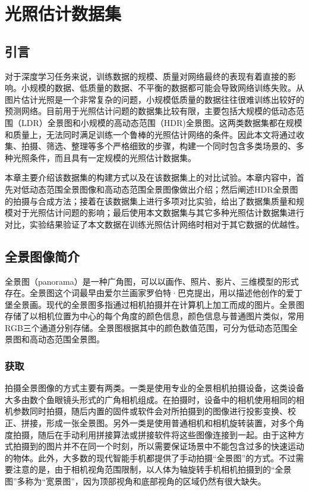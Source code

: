 \chapter{光照估计数据集}
\section{引言}
对于深度学习任务来说，训练数据的规模、质量对网络最终的表现有着直接的影响。小规模的数据、低质量的数据、不平衡的数据都可能会导致网络训练失败。从图片估计光照是一个非常复杂的问题，小规模低质量的数据往往很难训练出较好的预测网络。目前用于光照估计问题的数据集比较有限，主要包括大规模的低动态范围（LDR）全景图和小规模的高动态范围（HDR)全景图。这两类数据集都在规模和质量上，无法同时满足训练一个鲁棒的光照估计网络的条件。因此本文将通过收集、拍摄、筛选、整理等多个严格细致的步骤，构建一个同时包含多类场景的、多种光照条件，而且具有一定规模的光照估计数据集。

本章主要介绍该数据集的构建方式以及在该数据集上的对比试验。本章内容中，首先对低动态范围全景图像和高动态范围全景图像做出介绍；然后阐述HDR全景图的拍摄与合成方法；接着在该数据集上进行多项对比实验，给出了数据集质量和规模对于光照估计问题的影响；最后使用本文数据集与其它多种光照估计数据集进行对比，实验结果验证了本文数据在训练光照估计网络时相对于其它数据的优越性。

\section{全景图像简介}
全景图（panorama）是一种广角图，可以以画作、照片、影片、三维模型的形式存在。全景图这个词最早由爱尔兰画家罗伯特·巴克提出，用以描述他创作的爱丁堡全景画。现代的全景图多指通过相机拍摄并在计算机上加工而成的图片\cite{wikipedia}。全景图存储了以相机位置为中心的每个角度的颜色信息，颜色信息与普通图片类似，常用RGB三个通道分别存储。全景图根据其中的颜色数值范围，可分为低动态范围全景图和高动态范围全景图。

\subsection{获取}
拍摄全景图像的方式主要有两类。一类是使用专业的全景相机拍摄设备，这类设备大多由数个鱼眼镜头形式的广角相机组成。在拍摄时，设备中的相机使用相同的相机参数同时拍摄，随后内置的固件或软件会对所拍摄到的图像进行投影变换、校正、拼接，形成一张全景图。另外一类是使用普通相机和相机旋转装置，对多个角度拍摄，随后在手动利用拼接算法或拼接软件将这些图像连接到一起。由于这种方式拍摄到的图片并不在同一个时刻，所以需要保证场景中不能包含过多的快速运动的物体。此外，大多数的现代智能手机都提供了手动拍摄“全景图”的方式。不过需要注意的是，由于相机视角范围限制，以人体为轴旋转手机相机拍摄到的“全景图”多称为“宽景图”，因为顶部视角和底部视角的区域仍然有很大缺失。

